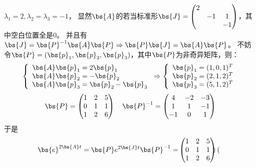 \documentclass[12pt, a4paper, oneside, UTF8]{ctexbook}
\begin{document}
\begin{solution}
    $\lambda_1=2,\lambda_2=\lambda_3=-1$，
    显然$\bs{A}$的若当标准形$\bs{J}=\begin{pmatrix}
        2 & & \\
         & -1 & 1\\
         & & -1
    \end{pmatrix}$，其中空白位置全是$0$。
    并且有$\bs{J}=\bs{P}^{-1}\bs{A}\bs{P} \Rightarrow \bs{P}\bs{J}=\bs{A}\bs{P}$。
    不妨令$\bs{P}=(\bs{p}_1,\bs{p}_2,\bs{p}_3)$，其中$\bs{P}$为非奇异矩阵，则：
    \begin{align*}
        \left\{
            \begin{array}{ll}
                \bs{A}\bs{p}_1=2\bs{p}_1 \\
                \bs{A}\bs{p}_2=-\bs{p}_2 \\
                \bs{A}\bs{p}_3=\bs{p}_2-\bs{p}_3
            \end{array} 
            \right.
            \Rightarrow
            \left\{
            \begin{array}{ll}
                \bs{p}_1=(1,0,1)^T \\
                \bs{p}_2=(2,1,2)^T \\
                \bs{p}_3=(5,1,2)^T
            \end{array} 
            \right.
    \end{align*}
    \begin{align*}
        \bs{P}=\begin{pmatrix}
            1 & 2 &5 \\
            0 & 1 &1 \\
            1 & 2 & 6
        \end{pmatrix} \quad
        \bs{P}^{-1}=\begin{pmatrix}
            4 & -2 &-3 \\
            1 & 1 &-1 \\
            -1 & 0 & 1        
        \end{pmatrix}
    \end{align*}
    于是
    \begin{align*}
    \bs{e}^{2\bs{A}t}=\bs{P}e^{2\bs{J}t}\bs{P}^{-1}
    =&\begin{pmatrix}
        1 & 2 &5 \\
        0 & 1 &1 \\
        1 & 2 & 6
    \end{pmatrix}\begin{pmatrix}

\end{pmatrix}
\end{align*}
\end{solution}
\end{document}

